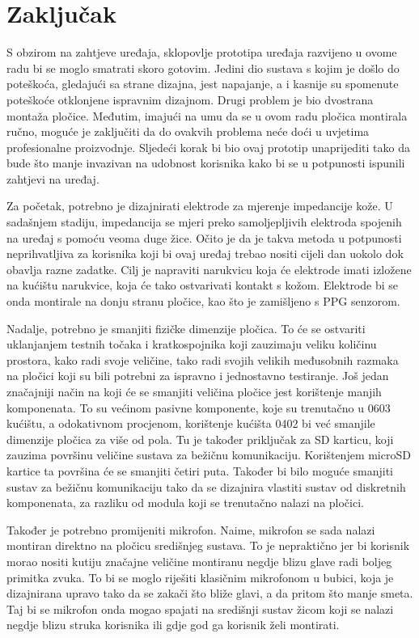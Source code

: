 \chapter{Zaključak}
\label{pog:zakljucak}

S obzirom na zahtjeve uređaja, sklopovlje prototipa uređaja razvijeno u ovome radu bi se moglo smatrati skoro gotovim. Jedini dio sustava s kojim je došlo do poteškoća, gledajući sa strane dizajna, jest napajanje, a i kasnije su spomenute poteškoće otklonjene ispravnim dizajnom. Drugi problem je bio dvostrana montaža pločice. Međutim, imajući na umu da se u ovom radu pločica montirala ručno, moguće je zaključiti da do ovakvih problema neće doći u uvjetima profesionalne proizvodnje. Sljedeći korak bi bio ovaj prototip unaprijediti tako da bude što manje invazivan na udobnost korisnika kako bi se u potpunosti ispunili zahtjevi na uređaj.

Za početak, potrebno je dizajnirati elektrode za mjerenje impedancije kože. U sadašnjem stadiju, impedancija se mjeri preko samoljepljivih elektroda spojenih na uređaj s pomoću veoma duge žice. Očito je da je takva metoda u potpunosti neprihvatljiva za korisnika koji bi ovaj uređaj trebao nositi cijeli dan uokolo dok obavlja razne zadatke. Cilj je napraviti narukvicu koja će elektrode imati izložene na kućištu narukvice, koja će tako ostvarivati kontakt s kožom. Elektrode bi se onda montirale na donju stranu pločice, kao što je zamišljeno s PPG senzorom.

Nadalje, potrebno je smanjiti fizičke dimenzije pločica. To će se ostvariti uklanjanjem testnih točaka i kratkospojnika koji zauzimaju veliku količinu prostora, kako radi svoje veličine, tako radi svojih velikih međusobnih razmaka na pločici koji su bili potrebni za ispravno i jednostavno testiranje. Još jedan značajniji način na koji će se smanjiti veličina pločice jest korištenje manjih komponenata. To su većinom pasivne komponente, koje su trenutačno u 0603 kućištu, a odokativnom procjenom, korištenje kućišta 0402 bi već smanjile dimenzije pločica za više od pola. Tu je također priključak za SD karticu, koji zauzima površinu veličine sustava za bežičnu komunikaciju. Korištenjem microSD kartice ta površina će se smanjiti četiri puta. Također bi bilo moguće smanjiti sustav za bežičnu komunikaciju tako da se dizajnira vlastiti sustav od diskretnih komponenata, za razliku od modula koji se trenutačno nalazi na pločici.

Također je potrebno promijeniti mikrofon. Naime, mikrofon se sada nalazi montiran direktno na pločicu središnjeg sustava. To je nepraktično jer bi korisnik morao nositi kutiju značajne veličine montiranu negdje blizu glave radi boljeg primitka zvuka. To bi se moglo riješiti klasičnim mikrofonom u bubici, koja je dizajnirana upravo tako da se zakači što bliže glavi, a da pritom što manje smeta. Taj bi se mikrofon onda mogao spajati na središnji sustav žicom koji se nalazi negdje blizu struka korisnika ili gdje god ga korisnik želi montirati.

